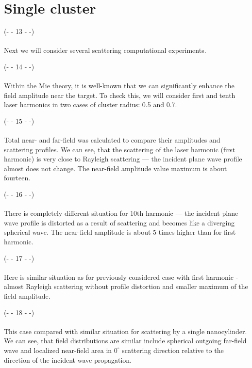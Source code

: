 \section{Single cluster}

\noindent(- - 13 - -)\\~\\

Next we will consider several scattering computational experiments.

\noindent(- - 14 - -)\\~\\
Within the Mie theory, it is well-known that we can significantly enhance the field amplitude near the target. To check this, we will consider first and tenth laser harmonics in two cases of cluster radius: 0.5 and 0.7.

\noindent(- - 15 - -)\\~\\
Total near- and far-field was calculated to compare their amplitudes and scattering profiles. We can see, that the scattering of the laser harmonic (first harmonic) is very close to Rayleigh scattering --- the incident plane wave profile almost does not change. The near-field amplitude value maximum is about fourteen.

\noindent(- - 16 - -)\\~\\
There is completely different situation for 10th harmonic --- the incident plane wave profile is distorted as a result of scattering and becomes like a diverging spherical wave. The near-field amplitude is about 5 times higher than for first harmonic.

\noindent(- - 17 - -)\\~\\
Here is similar situation as for previously considered case with first harmonic - almost Rayleigh scattering without profile distortion and smaller maximum of the field amplitude.

\noindent(- - 18 - -)\\~\\
This case compared with similar situation for scattering by a single nanocylinder. We can see, that field distributions are similar include spherical outgoing far-field wave and localized near-field area in $0^{\circ}$ scattering direction relative to the direction of the incident wave propagation.